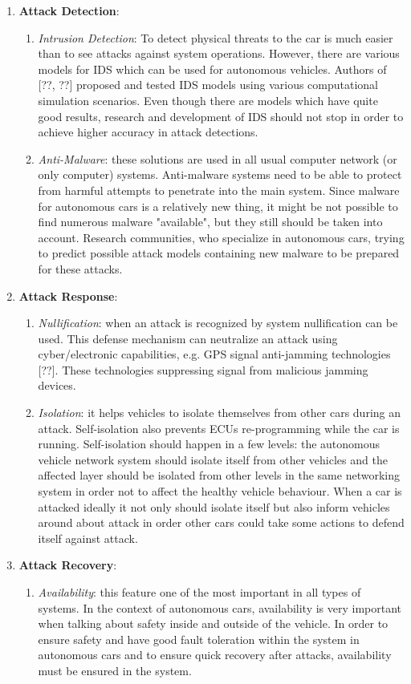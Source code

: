 \begin{enumerate}
	\item \textbf{Attack Detection}:
	\begin{enumerate}
		\item \textit{Intrusion Detection}: To detect physical threats to the car is much easier than to see attacks against system operations. However, there are various models for \gls{IDS} which can be used for autonomous vehicles. Authors of [??, ??] proposed and tested \gls{IDS} models using various computational simulation scenarios. Even though there are models which have quite good results, research and development of \gls{IDS} should not stop in order to achieve higher accuracy in attack detections. 
		\item \textit{Anti-Malware}: these solutions are used in all usual computer network (or only computer) systems. Anti-malware systems need to be able to protect from harmful attempts to penetrate into the main system. Since malware for autonomous cars is a relatively new thing, it might be not possible to find numerous malware "available", but they still should be taken into account. Research communities, who specialize in autonomous cars, trying to predict possible attack models containing new malware to be prepared for these attacks.
	\end{enumerate}
	\item \textbf{Attack Response}:
	\begin{enumerate}
		\item \textit{Nullification}: when an attack is recognized by system nullification can be used. This defense mechanism can neutralize an attack using cyber/electronic capabilities, e.g. \gls{GPS} signal anti-jamming technologies [??]. These technologies suppressing signal from malicious jamming devices.
		\item \textit{Isolation}: it helps vehicles to isolate themselves from other cars during an attack. Self-isolation also prevents \glspl{ECU} re-programming while the car is running. Self-isolation should happen in a few levels: the autonomous vehicle network system should isolate itself from other vehicles and the affected layer should be isolated from other levels in the same networking system in order not to affect the healthy vehicle behaviour. When a car is attacked ideally it not only should isolate itself but also inform vehicles around about attack in order other cars could take some actions to defend itself against attack.
	\end{enumerate}
	\item \textbf{Attack Recovery}:
	\begin{enumerate}
		\item \textit{Availability}: this feature one of the most important in all types of systems. In the context of autonomous cars, availability is very important when talking about safety inside and outside of the vehicle. In order to ensure safety and have good fault toleration within the system in autonomous cars and to ensure quick recovery after attacks, availability must be ensured in the system.
	\end{enumerate}
\end{enumerate}	

